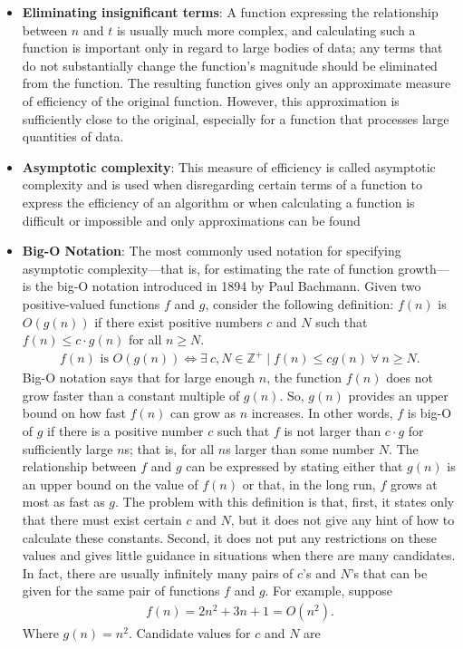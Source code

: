 \documentclass{report}
\begin{document}
\begin{itemize}
        \item \textbf{Eliminating insignificant terms}: A function expressing the relationship between $n$ and $t$ is usually much more complex, and calculating such a function is important only in regard to large bodies of data; any terms that do not substantially change the function’s magnitude should  be eliminated from the function. The resulting function gives only an approximate measure of efficiency of the original function. However, this approximation is sufficiently close to the original, especially for a function that processes large quantities of data.
        \item \textbf{Asymptotic complexity}:  This measure of efficiency is called asymptotic complexity and is used when disregarding certain terms of a function to express the efficiency of an algorithm or when calculating a function is difficult or impossible and only approximations can be found
        \item \textbf{Big-O Notation}: The most commonly used notation for specifying asymptotic complexity—that is, for estimating the rate of function growth—is the big-O notation introduced in 1894 by Paul Bachmann.
            \bigbreak \noindent 
             Given two positive-valued functions $f$ and $g$, consider the following definition:
             \bigbreak \noindent 
             $f(n)$ is $O(g(n))$ if there exist positive numbers $c$ and $N$ such that $f(n) \leq c \cdot g(n)$ for all $n \geq N$.
             \begin{align*}
                 f(n) \text{ is } O(g(n)) \iff \exists\ c,N \in \mathbb{Z}^{+} \mid f(n) \le cg(n)\ \forall\ n \ge N
             .\end{align*}
             \bigbreak \noindent 
             Big-O notation says that for large enough $n$, the function $f(n)$ does not grow faster than a constant multiple of $g(n)$. So, $g(n)$ provides an upper bound on how fast $f(n)$ can grow as $n$ increases.
             \bigbreak \noindent 
             In other words, $f$ is big-O of $g$ if there is a positive number $c$ such that $f$ is not larger than $c \cdot g$ for sufficiently large $n$s; that is, for all $n$s larger than some number $N$. The relationship between $f$ and $g$ can be expressed by stating either that $g(n)$ is an upper bound on the value of $f(n)$ or that, in the long run, $f$ grows at most as fast as $g$.
             \bigbreak \noindent 
             The problem with this definition is that, first, it states only that there must exist
             certain $c$ and $N$, but it does not give any hint of how to calculate these constants. Second, it does not put any restrictions on these values and gives little guidance in situations when there are many candidates. In fact, there are usually infinitely many pairs
             of $c$'s and $N$'s that can be given for the same pair of functions $f$ and $g$.
             \bigbreak \noindent 
             For example, suppose 
             \begin{align*}
                 f(n) = 2n^{2} + 3n + 1 = O(n^{2})
             .\end{align*}
             Where $g(n) = n^{2}$. Candidate values for $c$ and $N$ are


\end{itemize}
\end{document}
